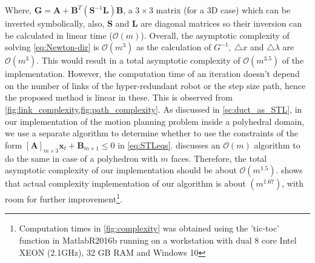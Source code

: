 \documentclass[12pt,a4]{article}
\begin{document}
 Where, $\textbf{G}= \textbf{A}+\textbf{B}^T(\textbf{S}^{-1}\textbf{L})\textbf{B}$, a $3\times3$ matrix (for a 3D case) which can be inverted symbolically, also, $\textbf{S}$ and $\textbf{L}$ are diagonal matrices so their inversion can be calculated in linear time ($\mathcal{O}(m)$). Overall, the asymptotic complexity of solving \cref{eq:Newton-dir} is $\mathcal{O}(m^3)$ as the calculation of $ G^{-1},~ \triangle x$ and $\triangle \lambda$ are $\mathcal{O}(m^3)$. This would result in a total asymptotic complexity of $\mathcal{O}(m^{3.5})$ of the implementation. However, the computation time of an iteration doesn't depend on the number of links of the hyper-redundant robot or the step size path, hence the proposed method is linear in these. This is observed from \cref{fig:link_complexity,fig:path_complexity}. As discussed in \cref{sc:duct_as_STL}, in our implementation of the motion planning problem inside a polyhedral domain, we use a separate algorithm to determine whether to use the constraints of the form $[\mathbf{A}]_{m\times 3}\mathbf{x}_t+\mathbf{B}_{m\times 1}\leq 0$ in \cref{eq:STLeqs}.  discusses an $\mathcal{O}(m)$ algorithm to do the same in case of a polyhedron with $ m $ faces. Therefore, the total asymptotic complexity of our implementation should be about $\mathcal{O}(m^{1.5})$.  shows that actual complexity implementation of our algorithm is about $(m^{1.67})$, with room for further improvement\footnote{Computation times in \cref{fig:complexity} was obtained using the 'tic-toc' function in MatlabR2016b running on a workstation with dual 8 core Intel XEON (2.1GHz), 32 GB RAM and Windows 10}. 
\end{document}
